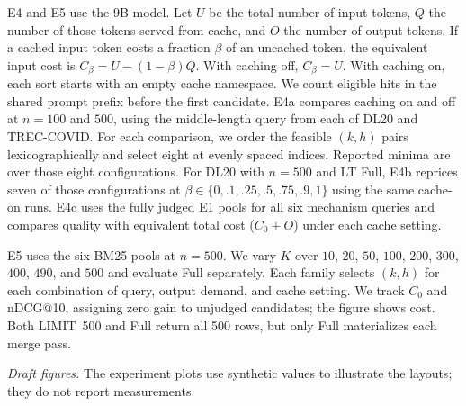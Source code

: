 E4 and E5 use the 9B model. Let $U$ be the total number of input tokens, $Q$ the number of those tokens served from cache, and $O$ the number of output tokens. If a cached input token costs a fraction $\beta$ of an uncached token, the equivalent input cost is $C_\beta=U-(1-\beta)Q$. With caching off, $C_\beta=U$. With caching on, each sort starts with an empty cache namespace. We count eligible hits in the shared prompt prefix before the first candidate.
E4a compares caching on and off at $n=100$ and $500$, using the middle-length query from each of DL20 and TREC-COVID. For each comparison, we order the feasible $(k,h)$ pairs lexicographically and select eight at evenly spaced indices. Reported minima are over those eight configurations. For DL20 with $n=500$ and LT Full, E4b reprices seven of those configurations at $\beta\in\{0,.1,.25,.5,.75,.9,1\}$ using the same cache-on runs. E4c uses the fully judged E1 pools for all six mechanism queries and compares quality with equivalent total cost ($C_0+O$) under each cache setting.

E5 uses the six BM25 pools at $n=500$. We vary $K$ over $10$, $20$, $50$, $100$, $200$, $300$, $400$, $490$, and $500$ and evaluate Full separately. Each family selects $(k,h)$ for each combination of query, output demand, and cache setting. We track $C_0$ and nDCG@10, assigning zero gain to unjudged candidates; the figure shows cost. Both \textsf{LIMIT}~500 and Full return all 500 rows, but only Full materializes each merge pass.




\noindent\textit{Draft figures.} The experiment plots use synthetic values to illustrate the layouts; they do not report measurements.
